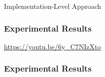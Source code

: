 \begin{frame}{Implementation-Level Approach}
    \begin{figure}
        \centerline{}
    \end{figure}
\end{frame}


\begin{frame}
    \frametitle{Experimental Results}
    \centering
    \LARGE
    \textcolor{hicolour}{\url{https://youtu.be/6y\_C7NIzXto}}
\end{frame}

\begin{frame}
    \frametitle{Experimental Results}
    \begin{figure}[h]
        \centering
        \resizebox{0.9\textwidth}{!}{}
    \end{figure}
\end{frame}

